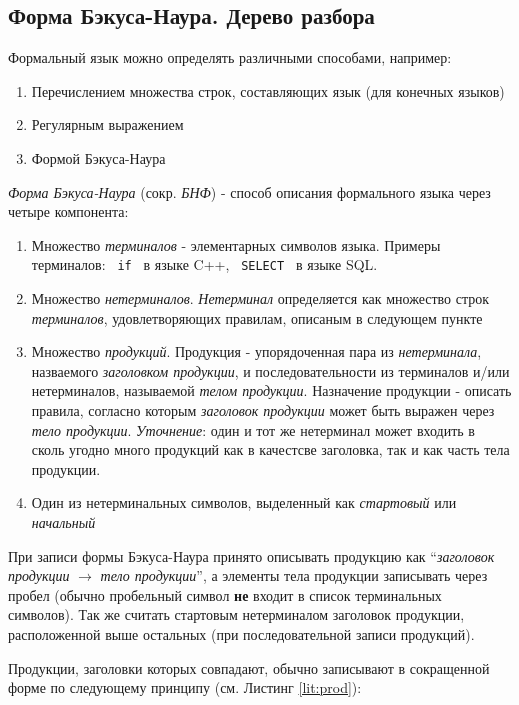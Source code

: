 \subsection{Форма Бэкуса-Наура. Дерево разбора} \label{lit:bnf}

Формальный язык можно определять различными способами, например:
\begin{enumerate}
    \item Перечислением множества строк, составляющих язык (для конечных языков)
    \item Регулярным выражением
    \item Формой Бэкуса-Наура
\end{enumerate}

\textit{Форма Бэкуса-Наура} (сокр. \textit{БНФ}) - способ описания формального языка через четыре компонента:
\begin{enumerate}
    \item Множество \textit{терминалов} - элементарных символов языка. Примеры терминалов: \texttt{ if } в языке C++, \texttt{ SELECT } в языке SQL.
    \item Множество \textit{нетерминалов}. \textit{Нетерминал} определяется как множество строк \textit{терминалов}, удовлетворяющих правилам, описаным в следующем пункте
    \item Множество \textit{продукций}. Продукция - упорядоченная пара из \textit{нетерминала}, назваемого \textit{заголовком продукции}, и последовательности из терминалов и/или нетерминалов, называемой \textit{телом продукции}. Назначение продукции - описать правила, согласно которым \textit{заголовок продукции} может быть выражен через \textit{тело продукции}. \textit{Уточнение}: один и тот же нетерминал может входить в сколь угодно много продукций как в качестсве заголовка, так и как часть тела продукции.
    \item Один из нетерминальных символов, выделенный как \textit{стартовый} или \textit{начальный}
\end{enumerate}

При записи формы Бэкуса-Наура принято описывать продукцию как \enquote{\textit{заголовок продукции} $\rightarrow$ \textit{тело продукции}}, а элементы тела продукции записывать через пробел (обычно пробельный символ \textbf{не} входит в список терминальных символов). Так же считать стартовым нетерминалом заголовок продукции, расположенной выше остальных (при последовательной записи продукций).

Продукции, заголовки которых совпадают, обычно записывают в сокращенной форме по следующему принципу (см. Листинг \ref{lit:prod}):

